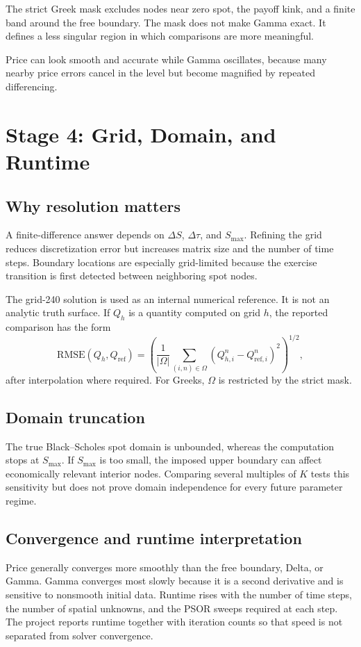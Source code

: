 The strict Greek mask excludes nodes near zero spot, the payoff kink, and a
finite band around the free boundary. The mask does not make Gamma exact. It
defines a less singular region in which comparisons are more meaningful.

\begin{readerintuition}
Price can look smooth and accurate while Gamma oscillates, because many nearby
price errors cancel in the level but become magnified by repeated
differencing.
\end{readerintuition}

\section{Stage 4: Grid, Domain, and Runtime}

\subsection{Why resolution matters}
A finite-difference answer depends on \(\Delta S\), \(\Delta\tau\), and
\(S_{\max}\). Refining the grid reduces discretization error but increases
matrix size and the number of time steps. Boundary locations are especially
grid-limited because the exercise transition is first detected between
neighboring spot nodes.

The grid-240 solution is used as an internal numerical reference. It is not an
analytic truth surface. If \(Q_h\) is a quantity computed on grid \(h\), the
reported comparison has the form
\[
  \mathrm{RMSE}(Q_h,Q_{\mathrm{ref}})
  =
  \left(
    \frac{1}{|\Omega|}
    \sum_{(i,n)\in\Omega}
    \left(Q_{h,i}^n-Q_{\mathrm{ref},i}^n\right)^2
  \right)^{1/2},
\]
after interpolation where required. For Greeks, \(\Omega\) is restricted by
the strict mask.

\subsection{Domain truncation}
The true Black--Scholes spot domain is unbounded, whereas the computation stops
at \(S_{\max}\). If \(S_{\max}\) is too small, the imposed upper boundary can
affect economically relevant interior nodes. Comparing several multiples of
\(K\) tests this sensitivity but does not prove domain independence for every
future parameter regime.

\subsection{Convergence and runtime interpretation}
Price generally converges more smoothly than the free boundary, Delta, or
Gamma. Gamma converges most slowly because it is a second derivative and is
sensitive to nonsmooth initial data. Runtime rises with the number of time
steps, the number of spatial unknowns, and the PSOR sweeps required at each
step. The project reports runtime together with iteration counts so that speed
is not separated from solver convergence.


